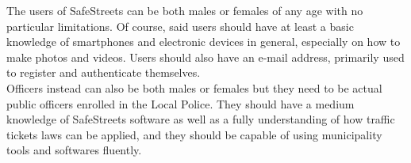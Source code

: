 The users of SafeStreets can be both males or females of any age with no particular limitations. Of course, said users should have at least a basic knowledge of smartphones and electronic devices in general, especially on how to make photos and videos.
Users should also have an e-mail address, primarily used to register and authenticate themselves.\\
Officers instead can also be both males or females but they need to be actual public officers enrolled in the Local Police.
They should have a medium knowledge of SafeStreets software as well as a fully understanding of how traffic tickets laws can be applied, and they should be capable of using municipality tools and softwares fluently.